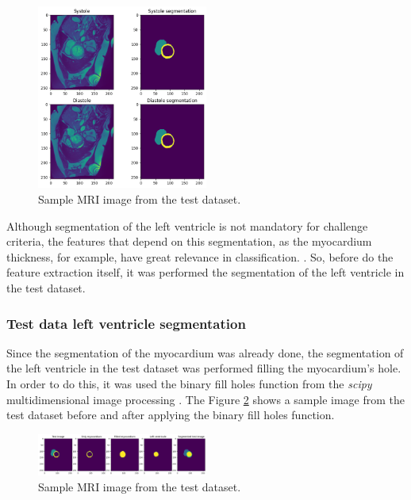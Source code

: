 \documentclass[conference]{IEEEtran}
\begin{document}
    \begin{figure}[!ht]
    \centering
    \includegraphics[width=0.5\textwidth]{images/diast_syst_seg_test.png}
    \caption{Sample MRI image from the test dataset.}
    \label{fig:diast_syst_seg_test}
    \end{figure}

    Although segmentation of the left ventricle is not mandatory for challenge criteria, 
    the features that depend on this segmentation, as the myocardium thickness, for example,
    have great relevance in classification. \cite{Khened2018, Fabian2018, Bernard2018}. So, before do the 
    feature extraction itself, it was performed the segmentation of the left ventricle in the test dataset.

    \subsubsection{Test data left ventricle segmentation}

    Since the segmentation of the myocardium was already done, the segmentation of the left ventricle
    in the test dataset was performed filling the myocardium's hole. In order to do this, it was used
    the binary fill holes function from the \textit{scipy} multidimensional image processing \cite{scipy}.
    The Figure \ref{fig:seg_test} shows a sample image from the test dataset before and after applying 
    the binary fill holes function.

    \begin{figure}[!ht]
        \centering
        \includegraphics[width=0.5\textwidth]{images/left_vent_seg.png}
        \caption{Sample MRI image from the test dataset.}
        \label{fig:seg_test}
    \end{figure}
\end{document}
